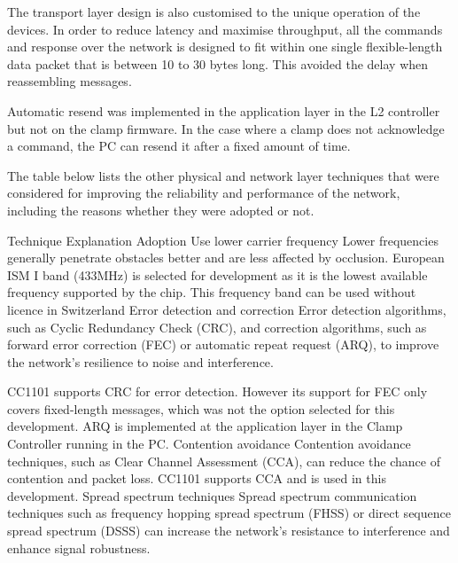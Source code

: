 The transport layer design is also customised to the unique operation of the devices. In order to reduce latency and maximise throughput, all the commands and response over the network is designed to fit within one single flexible-length data packet that is between 10 to 30 bytes long. This avoided the delay when reassembling messages. 

Automatic resend was implemented in the application layer in the L2 controller but not on the clamp firmware. In the case where a clamp does not acknowledge a command, the PC can resend it after a fixed amount of time. 

The table below lists the other physical and network layer techniques that were considered for improving the reliability and performance of the network, including the reasons whether they were adopted or not.

Technique
Explanation
Adoption
Use lower carrier frequency
Lower frequencies generally penetrate obstacles better and are less affected by occlusion.
European ISM I band (433MHz) is selected for development as it is the lowest available frequency supported by the chip. This frequency band can be used without licence in Switzerland \parencite{ofcomRadioInterfaceRegulation2020}
Error detection and correction
Error detection algorithms, such as Cyclic Redundancy Check (CRC), and correction algorithms, such as forward error correction (FEC) or automatic repeat request (ARQ), to improve the network's resilience to noise and interference.



CC1101 supports CRC for error detection. However its support for FEC only covers fixed-length messages, which was not the option selected for this development. 
ARQ is implemented at the application layer in the Clamp Controller running in the PC.
Contention avoidance
Contention avoidance techniques, such as Clear Channel
Assessment (CCA), can reduce the chance of contention and packet loss. 
CC1101 supports CCA and is used in this development.
Spread spectrum techniques
Spread spectrum communication techniques such as frequency hopping spread spectrum (FHSS) or direct sequence spread spectrum (DSSS) can increase the network's resistance to interference and enhance signal robustness.


